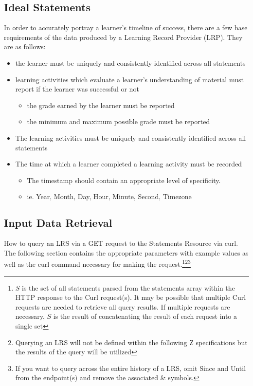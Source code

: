 \documentclass{article}
\begin{document}
\subsection{Ideal Statements}
In order to accurately portray a learner's timeline of success, there
are a few base requirements of the data produced by a Learning Record
Provider (LRP). They are as follows:

\begin{itemize}
\item the learner must be uniquely and consistently identified across
  all statements
\item learning activities which evaluate a learner's understanding of material must report if the learner was successful or not
  \begin{itemize}
  \item the grade earned by the learner must be reported
  \item the minimum and maximum possible grade must be reported
  \end{itemize}
\item The learning activities must be uniquely and consistently identified across all statements
\item The time at which a learner completed a learning activity must be recorded
  \begin{itemize}
  \item The timestamp should contain an appropriate level of specificity.
  \item ie. Year, Month, Day, Hour, Minute, Second, Timezone
  \end{itemize}
\end{itemize}

\subsection{Input Data Retrieval}
How to query an LRS via a GET request to the Statements Resource via
curl. The following section contains the appropriate parameters with
example values as well as the curl command necessary for making the
request.\footnote{\label{moreLink} $S$ is the set of all statements
  parsed from the statements array within the HTTP response to the
  Curl request(s). It may be possible that multiple Curl requests are
  needed to retrieve all query results. If multiple requests are
  necessary, $S$ is the result of concatenating the result of each
  request into a single set}\footnote{\label{noZ} Querying an LRS will
  not be defined within the following Z specifications but the results
  of the query will be utilized}\footnote{\label{allTime} If you want
  to query across the entire history of a LRS, omit Since and Until
  from the endpoint(s) and remove the associated \& symbols.}
\end{document}
